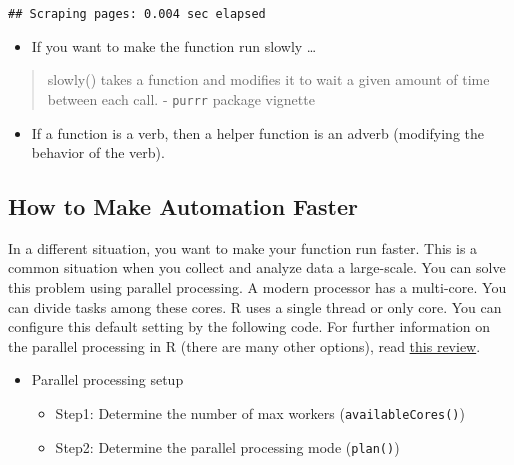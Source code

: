 \documentclass[
]{book}
\providecommand{\tightlist}{%
  \setlength{\itemsep}{0pt}\setlength{\parskip}{0pt}}
\begin{document}
\begin{verbatim}
## Scraping pages: 0.004 sec elapsed
\end{verbatim}

\begin{itemize}
\tightlist
\item
  If you want to make the function run slowly \ldots{}
\end{itemize}

\begin{quote}
slowly() takes a function and modifies it to wait a given amount of time between each call. - \texttt{purrr} package vignette
\end{quote}

\begin{itemize}
\tightlist
\item
  If a function is a verb, then a helper function is an adverb (modifying the behavior of the verb).
\end{itemize}

\hypertarget{how-to-make-automation-faster}{%
\subsection{How to Make Automation Faster}\label{how-to-make-automation-faster}}

In a different situation, you want to make your function run faster. This is a common situation when you collect and analyze data a large-scale. You can solve this problem using parallel processing. A modern processor has a multi-core. You can divide tasks among these cores. R uses a single thread or only core. You can configure this default setting by the following code. For further information on the parallel processing in R (there are many other options), read \href{https://yxue-me.com/post/2019-05-12-a-glossary-of-parallel-computing-packages-in-r-2019/}{this review}.

\begin{itemize}
\item
  Parallel processing setup

  \begin{itemize}
  \item
    Step1: Determine the number of max workers (\texttt{availableCores()})
  \item
    Step2: Determine the parallel processing mode (\texttt{plan()})
  \end{itemize}
\end{itemize}
\end{document}
